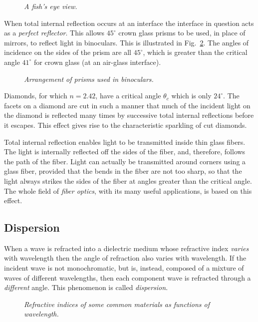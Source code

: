 \begin{figure}
\epsfysize=3in
\centerline{}
\caption{\em A fish's eye view.}\label{f12.8}
\end{figure}

When total internal reflection occurs at an interface the interface in question acts
as a {\em perfect reflector}. This allows $45^\circ$ crown glass
prisms to be used,
in place of mirrors, to reflect light in binoculars. This is
illustrated in Fig.~\ref{f12.9}. The angles of incidence on the
sides of the prism are all $45^\circ$, which is greater than
the critical angle $41^\circ$ for crown glass (at an air-glass
interface). 

\begin{figure}[h]
\epsfysize=2.5in
\centerline{}
\caption{\em Arrangement of prisms used in binoculars.}\label{f12.9}
\end{figure}

Diamonds, for which $n=2.42$, have a critical angle $\theta_c$ which
is only $24^\circ$. The facets on a diamond are cut in such a manner
that much of the incident light on the diamond is reflected many
times by successive total internal reflections before it
escapes. This effect gives rise to the 
characteristic sparkling of cut diamonds.

Total internal reflection enables light to be transmitted inside
thin glass fibers. The light is internally reflected off the
sides of the fiber, and, therefore, follows the path of the fiber.
Light can actually be transmitted around corners using a glass fiber,
provided that the bends in the fiber are not too sharp, so that the
light always strikes the sides of the fiber at angles greater than the
critical angle. The whole field  of {\em fiber optics},
with its many useful applications,  is based on this
effect. 

\subsection{Dispersion}
When a wave is refracted into a dielectric medium whose refractive
index {\em  varies}\/ with wavelength then the angle of refraction
also varies with wavelength. If the incident wave is not
monochromatic, but is, instead, composed of a mixture of waves of
different
wavelengths, then each component wave is refracted through
a {\em  different}\/ angle. This phenomenon is called {\em dispersion}. 

\begin{figure}
\epsfysize=4in
\centerline{}
\caption{\em Refractive indices of some common materials as functions of
wavelength.}\label{f12.10}
\end{figure}

